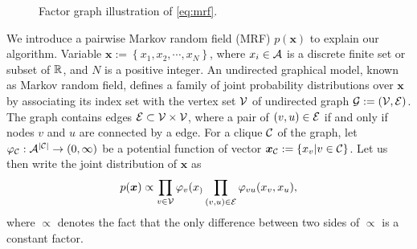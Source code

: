 \documentclass[conference,onecolumn]{IEEEtran}
\begin{document}
\begin{figure}
  \begin{centering}
    \caption{Factor graph illustration of \autoref{eq:mrf}.}\label{fig:factor-graph}
    \vspace{0.1cm}
  \end{centering}
\end{figure}
We introduce a pairwise Markov random field (MRF) $p(\bm{x})$ to
explain our algorithm. Variable $\bm{x} := \left\{ x_1, x_2, \cdots,
  x_N \right\}$, where $x_i \in \mathcal{A}$ is a discrete finite set or subset of
$\mathbb{R}$, and $N$ is a positive integer.
An undirected graphical model, known as Markov random field, defines a
family of joint probability distributions over $\bm{x}$ by associating
its index set with the vertex set $\mathcal{V}$ of undirected graph
$\mathcal{G}:=(\mathcal{V}, \mathcal{E})$. The graph contains edges $\mathcal{E} \subset \mathcal{V} \times
\mathcal{V}$, where a pair of $(v, u) \in \mathcal{E}$ if and only if nodes $v$ and
$u$ are connected by a edge. For a clique $\mathcal{C}$ of the graph, let
$\varphi_{\mathcal{C}}: \mathcal{A}^{| \mathcal{C} |} \rightarrow (0, \infty)$ be a potential
function of vector $\bm{x}_{\mathcal{C}}:=\left\{ x_v| v\in \mathcal{C} \right\}$. Let
us then write the joint distribution of $\bm{x}$ as
\begin{equation}\label{eq:mrf}
  p(\bm{x}) \propto \prod_{{v\in \mathcal{V}}} \varphi_v(x_) \prod_{(v,u) \in \mathcal{E}} \varphi_{vu}(x_v, x_u),
\end{equation}
where $\propto$ denotes the fact that the only difference between two sides of $\propto$ is a constant factor.
\end{document}
